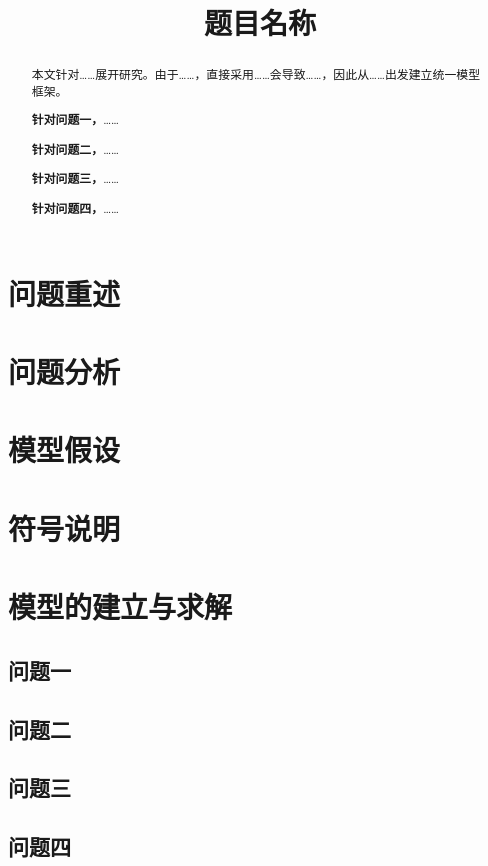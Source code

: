 \documentclass[withoutpreface,bwprint]{cumcmthesis}
\title{题目名称}
\begin{document}
\maketitle

\begin{abstract}
本文针对……展开研究。由于……，直接采用……会导致……，因此从……出发建立统一模型框架。

\textbf{针对问题一，}……

\textbf{针对问题二，}……

\textbf{针对问题三，}……

\textbf{针对问题四，}……

\end{abstract}

\section{问题重述}

\section{问题分析}

\section{模型假设}

\section{符号说明}

\section{模型的建立与求解}

\subsection{问题一}

\subsection{问题二}

\subsection{问题三}

\subsection{问题四}
\end{document}
